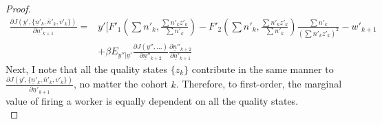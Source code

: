 \begin{proof}
\begin{equation*}
\begin{split}
    \frac{\partial J(y',\{\underline{n}'_k,\bar{n}'_k,v'_k\})}{\partial \underline{n}'_{k+1}} = & y'[F'_1(\sum n'_k,\frac{\sum n'_k z'_k}{\sum n'_k})-F'_2(\sum n'_k,\frac{\sum n'_k z'_k}{\sum n'_k}) \frac{\sum n'_k}{(\sum n'_k z'_k)^2}-w'_{k+1} \\  
&    + \beta E_{y''|y'}\frac{\partial J(y'',...)}{\partial \underline{n}''_{k+2}}\frac{\partial \underline{n}''_{k+2}}{\partial \underline{n}'_{k+1}}
\end{split}
\end{equation*}
Next, I note that all the quality states $\{z_k\}$ contribute in the same manner to $\frac{\partial J(y',\{\underline{n}'_k,\bar{n}'_k,v'_k\})}{\partial \underline{n}'_{k+1}}$, no matter the cohort $k$. Therefore, to first-order, the marginal value of firing a worker is equally dependent on all the quality states. \\
\end{proof}

